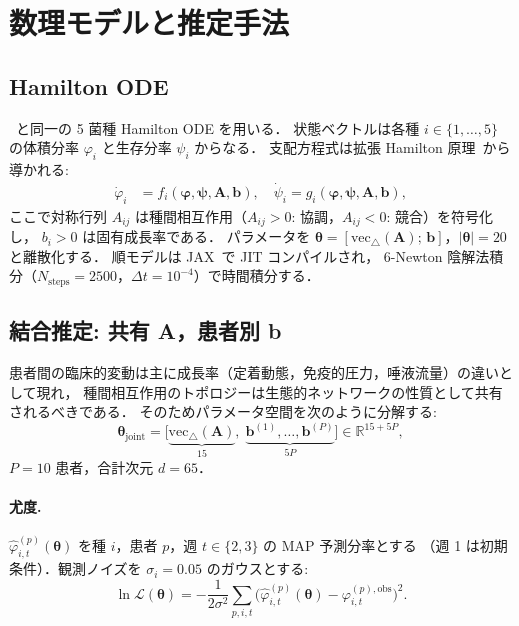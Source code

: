 \documentclass[11pt,a4paper]{article}
\newcommand{\btheta}{\boldsymbol{\theta}}
\newcommand{\bvarphi}{\boldsymbol{\varphi}}
\newcommand{\bpsi}{\boldsymbol{\psi}}
\newcommand{\bA}{\mathbf{A}}
\newcommand{\bb}{\mathbf{b}}
\newcommand{\Real}{\mathbb{R}}
\begin{document}
\section{数理モデルと推定手法}
\label{sec:methods}

\subsection{Hamilton ODE}

~\cite{NishiokaTMCMC2025,Klempt2025ContinuumBiofilm}と同一の 5 菌種 Hamilton ODE を用いる．
状態ベクトルは各種 $i\in\{1,\ldots,5\}$ の体積分率 $\varphi_i$ と生存分率 $\psi_i$ からなる．
支配方程式は拡張 Hamilton 原理~\cite{JunkerBalzani2021ExtendedHamilton}から導かれる:
\begin{align}
\dot\varphi_i &= f_i(\bvarphi, \bpsi, \bA, \bb),\quad
\dot\psi_i    = g_i(\bvarphi, \bpsi, \bA, \bb),
\label{eq:ode}
\end{align}
ここで対称行列 $A_{ij}$ は種間相互作用（$A_{ij}>0$: 協調，$A_{ij}<0$: 競合）を符号化し，
$b_i>0$ は固有成長率である．
パラメータを $\btheta = [\mathrm{vec}_{\triangle}(\bA);\, \bb]$，$|\btheta|=20$ と離散化する．
順モデルは JAX~\cite{jax2018github}で JIT コンパイルされ，
6-Newton 陰解法積分（$N_\mathrm{steps}=2500$，$\Delta t=10^{-4}$）で時間積分する．

\subsection{結合推定: 共有 A，患者別 b}

患者間の臨床的変動は主に成長率（定着動態，免疫的圧力，唾液流量）の違いとして現れ，
種間相互作用のトポロジーは生態的ネットワークの性質として共有されるべきである．
そのためパラメータ空間を次のように分解する:
\begin{equation}
\btheta_{\mathrm{joint}} = \bigl[\underbrace{\mathrm{vec}_{\triangle}(\bA)}_{15},\;
\underbrace{\bb^{(1)},\ldots,\bb^{(P)}}_{5P}\bigr]\in\Real^{15+5P},
\label{eq:joint}
\end{equation}
$P=10$ 患者，合計次元 $d=65$．

\paragraph{尤度.}
$\hat\varphi^{(p)}_{i,t}(\btheta)$ を種 $i$，患者 $p$，週 $t\in\{2,3\}$ の MAP 予測分率とする
（週 1 は初期条件）．観測ノイズを $\sigma_i = 0.05$ のガウスとする:
\begin{equation}
\ln\mathcal{L}(\btheta) = -\frac{1}{2\sigma^2}
\sum_{p,i,t}\bigl(\hat\varphi^{(p)}_{i,t}(\btheta) - \varphi^{(p),\mathrm{obs}}_{i,t}\bigr)^2.
\label{eq:llh}
\end{equation}
\end{document}

